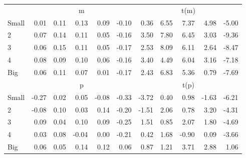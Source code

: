 \begin{table}[!ht]
\begin{tabular}{lrrrrrrrrrr}
  
    
      & \multicolumn{5}{c}{m} & \multicolumn{5}{c}{t(m)}
    
    \\
      \cmidrule(r){2-6} \cmidrule(r){7-11}

    Small   & 0.01  & 0.11  & 0.13  & 0.09  & -0.10  & 0.36  & 6.55  & 7.37  & 4.98  & -5.00  \\
         2  & 0.07  & 0.14  & 0.11  & 0.05  & -0.16  & 3.50  & 7.80  & 6.45  & 3.03  & -9.36  \\
         3  & 0.06  & 0.15  & 0.11  & 0.05  & -0.17  & 2.53  & 8.09  & 6.11  & 2.64  & -8.47  \\
         4  & 0.08  & 0.09  & 0.10  & 0.06  & -0.16  & 3.40  & 4.49  & 6.04  & 3.16  & -7.18  \\
    Big     & 0.06  & 0.11  & 0.07  & 0.01  & -0.17  & 2.43  & 6.83  & 5.36  & 0.79  & -7.69  \\

  
    
      & \multicolumn{5}{c}{p} & \multicolumn{5}{c}{t(p)}
    
    \\
      \cmidrule(r){2-6} \cmidrule(r){7-11}

    Small   & -0.27  & 0.02  & 0.05  & -0.08  & -0.33  & -3.72  & 0.40  & 0.98  & -1.63  & -6.21  \\
         2  & -0.08  & 0.10  & 0.03  & 0.14  & -0.20  & -1.51  & 2.06  & 0.78  & 3.20  & -4.31  \\
         3  & 0.09  & 0.04  & 0.10  & 0.09  & -0.25  & 1.51  & 0.85  & 2.07  & 1.80  & -4.69  \\
         4  & 0.03  & 0.08  & -0.04  & 0.00  & -0.21  & 0.42  & 1.68  & -0.90  & 0.09  & -3.66  \\
    Big     & 0.06  & 0.05  & 0.14  & 0.12  & 0.06  & 0.87  & 1.21  & 3.71  & 2.88  & 1.06  \\

  

  \bottomrule
\end{tabular}
\label{tbl:25_Size_Inv_B16}
\end{table}
